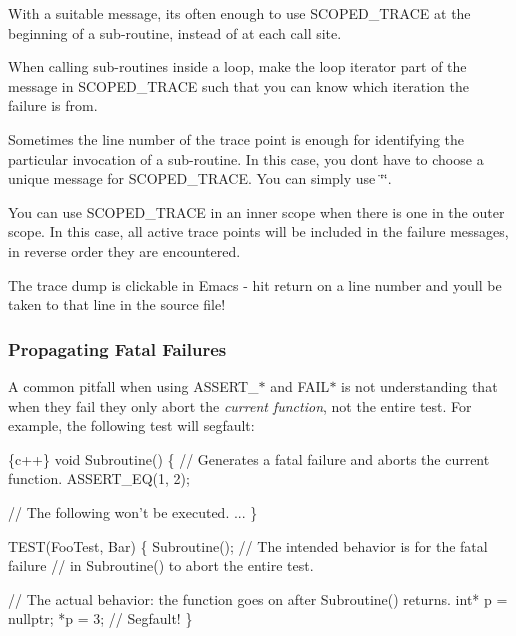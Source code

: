 \begin{DoxyEnumerate}
\item With a suitable message, it\textquotesingle{}s often enough to use {\ttfamily S\+C\+O\+P\+E\+D\+\_\+\+T\+R\+A\+CE} at the beginning of a sub-\/routine, instead of at each call site.
\item When calling sub-\/routines inside a loop, make the loop iterator part of the message in {\ttfamily S\+C\+O\+P\+E\+D\+\_\+\+T\+R\+A\+CE} such that you can know which iteration the failure is from.
\item Sometimes the line number of the trace point is enough for identifying the particular invocation of a sub-\/routine. In this case, you don\textquotesingle{}t have to choose a unique message for {\ttfamily S\+C\+O\+P\+E\+D\+\_\+\+T\+R\+A\+CE}. You can simply use {\ttfamily \char`\"{}\char`\"{}}.
\item You can use {\ttfamily S\+C\+O\+P\+E\+D\+\_\+\+T\+R\+A\+CE} in an inner scope when there is one in the outer scope. In this case, all active trace points will be included in the failure messages, in reverse order they are encountered.
\item The trace dump is clickable in Emacs -\/ hit {\ttfamily return} on a line number and you\textquotesingle{}ll be taken to that line in the source file!
\end{DoxyEnumerate}

\subsubsection*{Propagating Fatal Failures}

A common pitfall when using {\ttfamily A\+S\+S\+E\+R\+T\+\_\+$\ast$} and {\ttfamily F\+A\+I\+L$\ast$} is not understanding that when they fail they only abort the {\itshape current function}, not the entire test. For example, the following test will segfault\+:


\begin{DoxyCode}
\{c++\}
void Subroutine() \{
  // Generates a fatal failure and aborts the current function.
  ASSERT\_EQ(1, 2);

  // The following won't be executed.
  ...
\}

TEST(FooTest, Bar) \{
  Subroutine();  // The intended behavior is for the fatal failure
                 // in Subroutine() to abort the entire test.

  // The actual behavior: the function goes on after Subroutine() returns.
  int* p = nullptr;
  *p = 3;  // Segfault!
\}
\end{DoxyCode}


